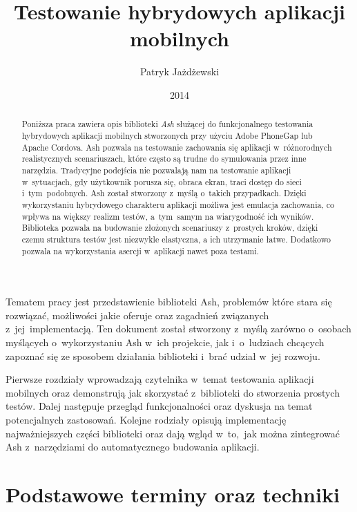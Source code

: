 \documentclass[brudnopis]{xmgr}
\author   {Patryk Jażdżewski}
\title    {Testowanie hybrydowych aplikacji mobilnych}
\date     {2014}
\begin{document}
\begin{abstract}
  Poniższa praca zawiera opis biblioteki \textit{Ash} służącej do funkcjonalnego testowania
hybrydowych aplikacji mobilnych stworzonych przy użyciu Adobe PhoneGap lub
Apache Cordova. Ash pozwala na testowanie zachowania się aplikacji w~różnorodnych
realistycznych scenariuszach, które często są trudne do symulowania przez inne narzędzia. Tradycyjne podejścia nie pozwalają nam na testowanie aplikacji w~sytuacjach, gdy  użytkownik porusza się,
obraca ekran, traci dostęp do sieci i~tym~podobnych. Ash został stworzony z~myślą o~takich przypadkach. Dzięki wykorzystaniu hybrydowego charakteru aplikacji
możliwa jest emulacja zachowania, co wpływa na większy realizm testów, a~tym~samym na wiarygodność ich wyników. 
Biblioteka pozwala na budowanie złożonych scenariuszy z~prostych kroków, dzięki czemu struktura testów jest niezwykle elastyczna, a ich utrzymanie łatwe. 
Dodatkowo pozwala na wykorzystania asercji w~aplikacji nawet poza testami. 

\end{abstract}

\maketitle

\introduction

Tematem pracy jest przedstawienie biblioteki Ash, problemów które stara się rozwiązać, możliwości jakie oferuje oraz zagadnień związanych z~jej~implementacją. Ten dokument  został stworzony z~myślą zarówno o~osobach myślących o~wykorzystaniu Ash w~ich projekcie, jak i~o~ludziach chcących zapoznać się ze sposobem działania biblioteki i~brać udział w~jej rozwoju.  

Pierwsze rozdziały wprowadzają czytelnika w~temat testowania aplikacji mobilnych oraz demonstrują jak skorzystać z~biblioteki do stworzenia prostych testów. Dalej następuje przegląd funkcjonalności oraz dyskusja na temat potencjalnych zastosowań. Kolejne rodziały opisują implementację najważniejszych części biblioteki oraz dają wgląd w~to,~jak można zintegrować Ash z~narzędziami do automatycznego budowania aplikacji.

\chapter{Podstawowe terminy oraz techniki}
\end{document}
